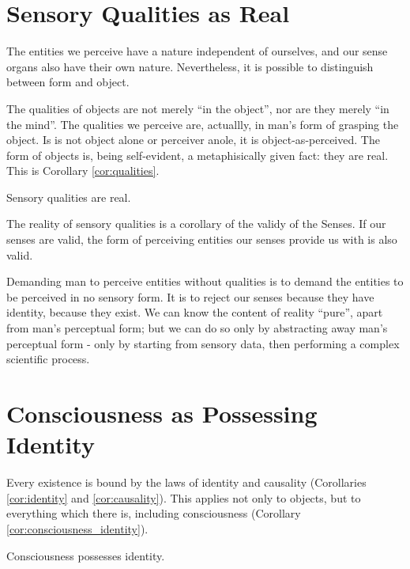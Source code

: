     \section{Sensory Qualities as Real}
        
        The entities we perceive have a nature independent of ourselves, and our sense organs also have their own nature. Nevertheless, it is possible to distinguish between form and object. 
        
        The qualities of objects are not merely ``in the object'', nor are they merely ``in the mind''. The qualities we perceive are, actuallly, in man's form of grasping the object. Is is not object alone or perceiver anole, it is object-as-perceived. The form of objects is, being self-evident, a metaphisically given fact: they are real. This is Corollary \ref{cor:qualities}.

            \begin{corollary}
            \label{cor:qualities}
                Sensory qualities are real.
            \end{corollary}

            \begin{remark}
                The reality of sensory qualities is a corollary of the validy of the Senses. If our senses are valid, the form of perceiving entities our senses provide us with is also valid.
            \end{remark}

        Demanding man to perceive entities without qualities is to demand the entities to be perceived in no sensory form. It is to reject our senses because they have identity, because they exist. We can know the content of reality ``pure'', apart from man's perceptual form; but we can do so only by abstracting away man's perceptual form - only by starting from sensory data, then performing a complex scientific process.
    
    \section{Consciousness as Possessing Identity}

        Every existence is bound by the laws of identity and causality (Corollaries \ref{cor:identity} and \ref{cor:causality}). This applies not only to objects, but to everything which there is, including consciousness (Corollary \ref{cor:consciousness_identity}).
        
            \begin{corollary}
            \label{cor:consciousness_identity}
                Consciousness possesses identity.
            \end{corollary}

